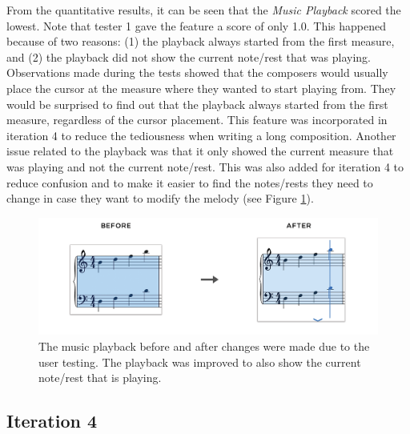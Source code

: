 			From the quantitative results, it can be seen that the \textit{Music Playback} scored the lowest. Note that tester 1 gave the feature a score of only 1.0. This happened because of two reasons: (1) the playback always started from the first measure, and (2) the playback did not show the current note/rest that was playing. Observations made during the tests showed that the composers would usually place the cursor at the measure where they wanted to start playing from. They would be surprised to find out that the playback always started from the first measure, regardless of the cursor placement. This feature was incorporated in iteration 4 to reduce the tediousness when writing a long composition. Another issue related to the playback was that it only showed the current measure that was playing and not the current note/rest. This was also added for iteration 4 to reduce confusion and to make it easier to find the notes/rests they need to change in case they want to modify the melody (see Figure \ref{fig:before-after-playback}). 

			\begin{figure}[h]
				\centering
				\includegraphics[scale=0.25]{figures/before-after-playback.png}
			    \caption{The music playback before and after changes were made due to the user testing. The playback was improved to also show the current note/rest that is playing.}
			    \label{fig:before-after-playback}
			\end{figure}


		\subsection{Iteration 4} %
		\label{sub:iteration_4}

